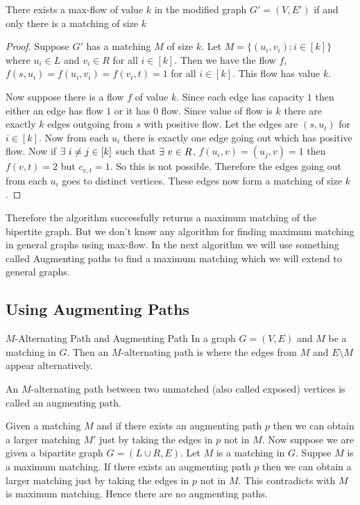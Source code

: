 \begin{lemma}{}{}
	There exists a max-flow of value $k$ in the modified graph $G'=(V,E')$ if and only there is a matching of size $k$
\end{lemma}
\begin{proof}
	  Suppose $G'$ has a matching $M$ of size $k$. Let $M=\{(u_i,v_i)\colon i\in[k]\}$ where $u_i\in L$ and $v_i\in R$ for all $i\in[k]$. Then we have the flow $f$, $f(s,u_i)=f(u_i,v_i)=f(v_i,t)=1$ for all $i\in[k]$. This flow has value $k$. 
	  
	  Now suppose there is a flow $f$ of value $k$. Since each edge has capacity $1$ then either an edge has flow $1$ or it has $0$ flow. Since value of flow is $k$ there are exactly $k$ edges outgoing from $s$ with positive flow. Let the edges are $(s,u_i)$ for $i\in[k]$. Now from each $u_i$ there is exactly one edge going out which has positive flow. Now if $\exists\ i\neq j\in[k]$ such that $\exists\ v\in R$, $f(u_i,v)=(u_j,v)=1$ then $f(v,t)=2$ but $c_{v,t}=1$. So this is not possible. Therefore the edges going out from each $u_i$ goes to distinct vertices. These edges now form a matching of size $k$. 
\end{proof}

Therefore the algorithm successfully returns a maximum matching of the bipertite graph. But we don't know any algorithm for finding maximum matching in general graphs using max-flow. In the next algorithm we will use something called Augmenting paths to find a maximum matching which we will extend to general graphs.
\subsection{Using Augmenting Paths}\label{section:bp-augment-path}
\begin{Definition}{$M$-Alternating Path and Augmenting Path}{}
	In a graph $G=(V,E)$ and $M$ be a matching in $G$. Then an $M$-alternating path is where the edges from $M$ and $E\setminus M$ appear alternatively.\parinn
	
	An $M$-alternating path between two unmatched (also called exposed) vertices is called an augmenting path. 
\end{Definition}

Given a matching $M$ and if there exists an augmenting path $p$ then we can obtain a larger matching $M'$ just by taking the edges in $p$ not in $M$. Now suppose we are given a bipartite graph $G=(L\cup R, E)$. Let $M$ is a matching in $G$. Suppse $M$ is a maximum matching. If there exists an augmenting path $p$ then we can obtain a larger matching just by taking the edges in $p$ not in $M$. This contradicts with $M$ is maximum matching. Hence there are no augmenting paths.
	

